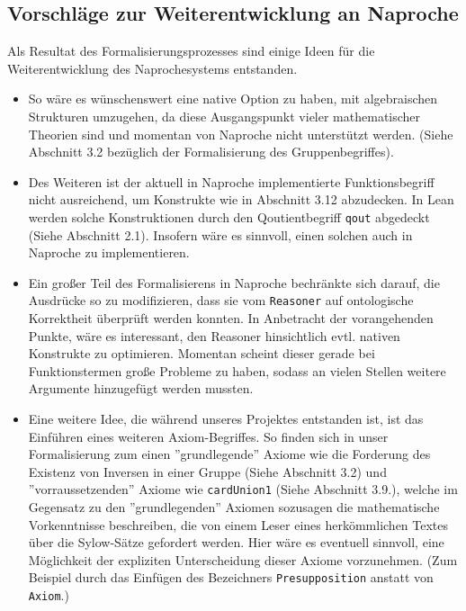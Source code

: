 \documentclass[a4paper,12pt]{scrartcl}
\begin{document}
\subsection{Vorschläge zur Weiterentwicklung an Naproche}

Als Resultat des Formalisierungsprozesses sind einige Ideen für die Weiterentwicklung des Naprochesystems entstanden.

\begin{itemize}
\item So wäre es wünschenswert eine native Option zu haben, mit algebraischen Strukturen umzugehen, da diese Ausgangspunkt vieler mathematischer Theorien sind und momentan von Naproche nicht unterstützt werden. (Siehe Abschnitt 3.2 bezüglich der Formalisierung des Gruppenbegriffes).

\item Des Weiteren ist der aktuell in Naproche implementierte Funktionsbegriff nicht ausreichend, um Konstrukte wie in Abschnitt 3.12 abzudecken. In Lean werden solche Konstruktionen durch den Qoutientbegriff \verb!qout! abgedeckt (Siehe Abschnitt 2.1). Insofern wäre es sinnvoll, einen solchen auch in Naproche zu implementieren.

\item Ein großer Teil des Formalisierens in Naproche bechränkte sich darauf, die Ausdrücke so zu modifizieren, dass sie vom \verb!Reasoner! auf ontologische Korrektheit überprüft werden konnten. In Anbetracht der vorangehenden Punkte, wäre es interessant, den Reasoner hinsichtlich evtl. nativen Konstrukte zu optimieren. Momentan scheint dieser gerade bei Funktionstermen große Probleme zu haben, sodass an vielen Stellen weitere Argumente hinzugefügt werden mussten.

\item Eine weitere Idee, die während unseres Projektes entstanden ist, ist das Einführen eines weiteren Axiom-Begriffes. So finden sich in unser Formalisierung zum einen ''grundlegende'' Axiome wie die Forderung des Existenz von Inversen in einer Gruppe (Siehe Abschnitt 3.2) und ''vorraussetzenden'' Axiome wie \verb!cardUnion1! (Siehe Abschnitt 3.9.), welche im Gegensatz zu den ''grundlegenden'' Axiomen sozusagen die mathematische Vorkenntnisse beschreiben, die von einem Leser eines herkömmlichen Textes über die Sylow-Sätze gefordert werden. Hier wäre es eventuell sinnvoll, eine Möglichkeit der expliziten Unterscheidung dieser Axiome vorzunehmen. (Zum Beispiel durch das Einfügen des Bezeichners \verb!Presupposition! anstatt von \verb!Axiom!.)


\end{itemize}
\end{document}
